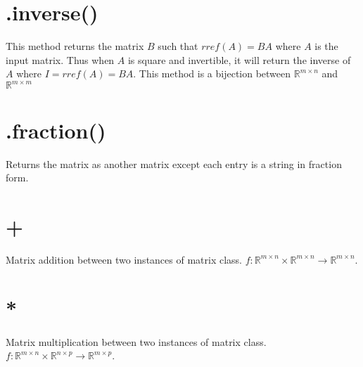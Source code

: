 \documentclass{article}
\begin{document}
\section{.inverse()}
This method returns the matrix \(B\) such that \(rref(A) = BA\) where \(A\) is the input matrix.
Thus when \(A\) is square and invertible, it will return the inverse of \(A\) where \(I = rref(A) = BA\). This method is a bijection between \(\mathbb{R}^{m \times n}\) and \(\mathbb{R}^{m \times m}\)

\section{.fraction()}
Returns the matrix as another matrix except each entry is a string in fraction form. 

\section{+}
Matrix addition between two instances of matrix class. \(f:\mathbb{R}^{m\times n} \times \mathbb{R}^{m \times n} \rightarrow \mathbb{R}^{m \times n}\).

\section{*}
Matrix multiplication between two instances of matrix class. \(f:\mathbb{R}^{m\times n} \times \mathbb{R}^{n \times p} \rightarrow \mathbb{R}^{m \times p}\).
\end{document}
